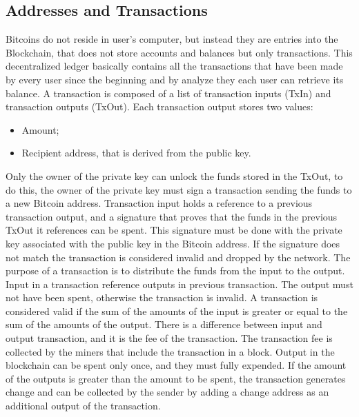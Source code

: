 \documentclass{article}
\begin{document}
\subsection*{Addresses and Transactions}
Bitcoins do not reside in user’s computer, but instead they are entries into the Blockchain,
that does not store accounts and balances but only transactions. This decentralized ledger basically contains all the transactions that have been made by every user since the beginning and by
analyze they each user can retrieve its balance. A transaction is composed of a list of transaction inputs (TxIn) and transaction outputs (TxOut). Each transaction output stores two values:
\begin{itemize}
    \item Amount;
    \item Recipient address, that is derived from the public key.
\end{itemize}
Only the owner of the private key can unlock the funds stored in the TxOut, to do this, the owner of the private key must sign a transaction sending the funds to a new Bitcoin address. Transaction input holds a reference to a previous transaction output, and a signature that proves that the funds in the previous TxOut it references can be spent.\newline
This signature must be done with the private key associated with the public key in the Bitcoin address. If the signature does not match the transaction is considered invalid and dropped by the network.\newline
The purpose of a transaction is to distribute the funds from the input to the output. Input in a transaction reference outputs in previous transaction. The output must not have been spent, otherwise the transaction is invalid.\newline
A transaction is considered valid if the sum of the amounts of the input is greater or equal to the sum of the amounts of the output.\newline
There is a difference between input and output transaction, and it is the fee of the transaction.\newline
The transaction fee is collected by the miners that include the transaction in a block.\newline
Output in the blockchain can be spent only once, and they must fully expended.\newline
If the amount of the outputs is greater than the amount to be spent, the transaction generates change and can be collected by the sender by adding a change address as an additional output of the transaction.\newline
\end{document}
